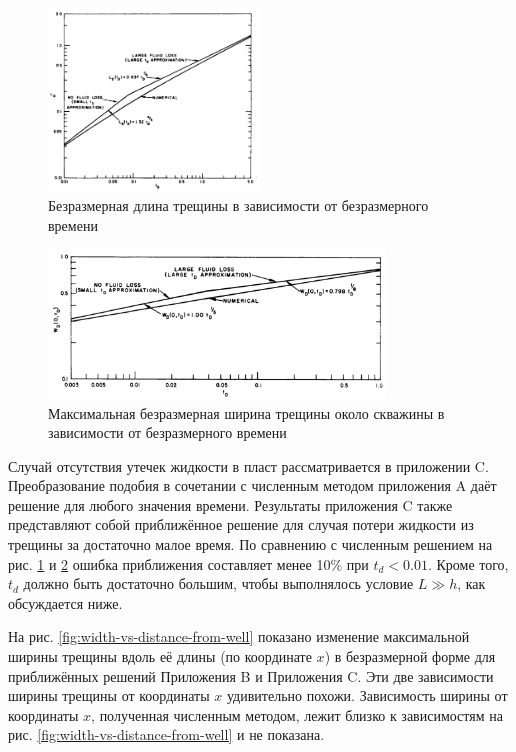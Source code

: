 \documentclass[a4paper, 11pt]{article}
\begin{document}
\begin{figure}[H]
\center
\includegraphics[width=0.5\textwidth]{length_vs_time}
\caption{Безразмерная длина трещины в зависимости от безразмерного времени} 
\label{fig:length-vs-time}  
\end{figure}


\begin{figure}[H]
\center
\includegraphics[width=0.8\textwidth]{maximum_width_at_well_vs_time}
\caption{Максимальная безразмерная ширина трещины около скважины в зависимости от безразмерного времени} 
\label{fig:width-at-well-vs-time}  
\end{figure}

Случай отсутствия утечек жидкости в пласт рассматривается в приложении C.
Преобразование подобия в сочетании с численным методом приложения A даёт решение для любого значения времени.
Результаты приложения C также представляют собой приближённое решение для случая потери жидкости из трещины за достаточно малое время.
По сравнению с численным решением на рис. \ref{fig:length-vs-time} и \ref{fig:width-at-well-vs-time} ошибка приближения составляет менее 10\% при $t_d<0.01$.
Кроме того, $t_d$ должно быть достаточно большим, чтобы выполнялось условие $L\gg h$, как обсуждается ниже.

На рис. \ref{fig:width-vs-distance-from-well} показано изменение максимальной ширины трещины вдоль её длины (по координате $x$) в безразмерной форме для приближённых решений Приложения B и Приложения C.
Эти две зависимости ширины трещины от координаты $x$ удивительно похожи.
Зависимость ширины от координаты $x$, полученная численным методом, лежит близко к зависимостям на рис. \ref{fig:width-vs-distance-from-well} и не показана.
\end{document}
